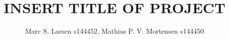 

\setcounter{secnumdepth}{0}

\title{INSERT TITLE OF PROJECT} 
\author{Marc S. Larsen s144452, Mathias P. V. Mortensen s144450}
\date{\vspace{-5ex}}



\maketitle







